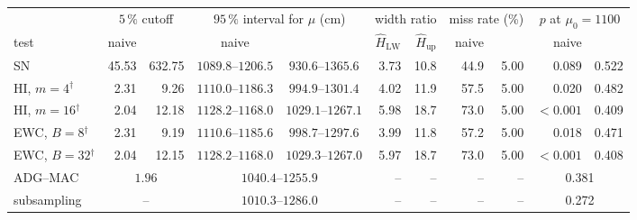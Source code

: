 \begin{tabular}{@{}lrrccrrrrrr@{}}\toprule
 & \multicolumn{2}{c}{$5\,\%$ cutoff} & \multicolumn{2}{c}{$95\,\%$ interval for $\mu$ (cm)} & \multicolumn{2}{c}{width ratio} & \multicolumn{2}{c}{miss rate (\%)} & \multicolumn{2}{c}{$p$ at $\mu_0=1100$}\\
\cmidrule(lr){2-3}\cmidrule(lr){4-5}\cmidrule(lr){6-7}\cmidrule(lr){8-9}\cmidrule(l){10-11}
test & naive & \CosCert{} & naive & \CosCert{} & $\hat H_{\mathrm{LW}}$ & $\hat H_{\mathrm{up}}$ & naive & \CosCert{} & naive & \CosCert{}\\\midrule
SN & 45.53 & 632.75 & $1089.8$--$1206.5$ & $930.6$--$1365.6$ & 3.73 & 10.8 & 44.9 & 5.00 & 0.089 & 0.522\\
HI, $m{=}4$$^\dagger$ & 2.31 & 9.26 & $1110.0$--$1186.3$ & $994.9$--$1301.4$ & 4.02 & 11.9 & 57.5 & 5.00 & 0.020 & 0.482\\
HI, $m{=}16$$^\dagger$ & 2.04 & 12.18 & $1128.2$--$1168.0$ & $1029.1$--$1267.1$ & 5.98 & 18.7 & 73.0 & 5.00 & $<0.001$ & 0.409\\
EWC, $B{=}8$$^\dagger$ & 2.31 & 9.19 & $1110.6$--$1185.6$ & $998.7$--$1297.6$ & 3.99 & 11.8 & 57.2 & 5.00 & 0.018 & 0.471\\
EWC, $B{=}32$$^\dagger$ & 2.04 & 12.15 & $1128.2$--$1168.0$ & $1029.3$--$1267.0$ & 5.97 & 18.7 & 73.0 & 5.00 & $<0.001$ & 0.408\\
\addlinespace
ADG--MAC & \multicolumn{2}{c}{$1.96$} & \multicolumn{2}{c}{$1040.4$--$1255.9$} & -- & -- & -- & -- & \multicolumn{2}{c}{0.381}\\
subsampling & \multicolumn{2}{c}{--} & \multicolumn{2}{c}{$1010.3$--$1286.0$} & -- & -- & -- & -- & \multicolumn{2}{c}{0.272}\\
\bottomrule\end{tabular}
